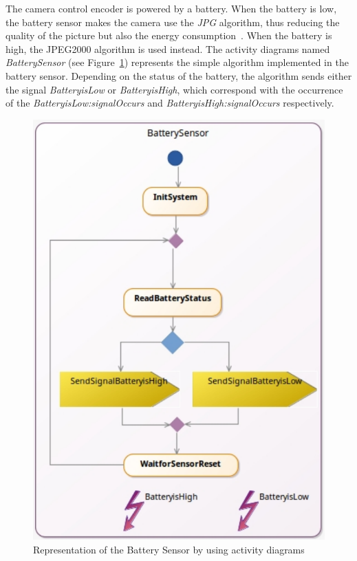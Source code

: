 The camera control encoder is powered by a battery. When the battery is low, the battery sensor makes the camera use the \emph{JPG} algorithm, thus reducing the quality of the picture but also the energy consumption~\cite{encodingcomparison}. When the battery is high, the JPEG2000 algorithm is used instead. The activity diagrams named \emph{BatterySensor} (see Figure~\ref{fig:batterysensor}) represents the simple algorithm implemented in the battery sensor. Depending on the status of the battery, the algorithm sends either the signal \emph{BatteryisLow} or \emph{BatteryisHigh}, which correspond with the occurrence of the \mse \emph{BatteryisLow:signalOccurs} and \emph{BatteryisHigh:signalOccurs} respectively.
	
	
			\begin{figure}[h]
				\center
				\includegraphics[width=.4\columnwidth]{examples/figs/BatterySensor.pdf}
				\caption{Representation of the Battery Sensor by using activity diagrams}
				\label{fig:batterysensor}
			\end{figure}
			
